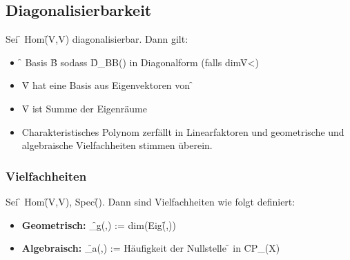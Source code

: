 \subsection{Diagonalisierbarkeit}
Sei \f{\Phi\in} Hom\f{(V,V)} diagonalisierbar. Dann gilt:
\begin{itemize}
    \item \f{\exists} Basis \f{B} sodass \f{D_{BB}(\Phi)} in Diagonalform (falls dim\f{V<\infty})
    \item \f{V} hat eine Basis aus Eigenvektoren von \f{\Phi} 
    \item \f{V} ist Summe der Eigenräume
    \item Charakteristisches Polynom zerfällt in Linearfaktoren und geometrische und algebraische Vielfachheiten stimmen überein.
\end{itemize}
\subsubsection*{Vielfachheiten}
Sei \f{\Phi\in} Hom\f{(V,V), \lambda\in} Spec\f{(\Phi)}. Dann sind Vielfachheiten wie folgt definiert:
\begin{itemize}
    \item \textbf{Geometrisch:} \f{\mu_g(\Phi,\lambda) :=} dim(Eig\f{(\Phi,\lambda)})
    \item \textbf{Algebraisch:} \f{\mu_a(\Phi,\lambda) :=} Häufigkeit der Nullstelle \f{\lambda} in \f{CP_\Phi(X)}
\end{itemize}